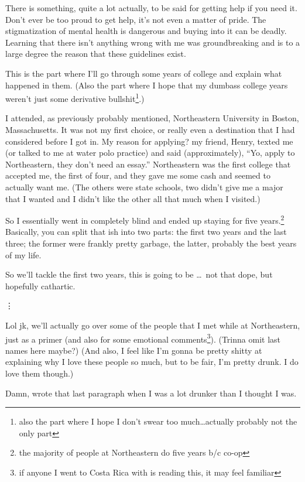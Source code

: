\documentclass[./butidigress.tex]{subfiles}
\begin{document}
There is something, quite a lot actually, to be said for getting help if you need it.
Don't ever be too proud to get help, it's not even a matter of pride.
The stigmatization of mental health is dangerous and buying into it can be deadly.
Learning that there isn't anything wrong with me was groundbreaking and is to a large degree the reason that these guidelines exist.

\label{subsec:narrative}
This is the part where I'll go through some years of college and explain what happened in them.
(Also the part where I hope that my dumbass college years weren't just some derivative bullshit\footnote{also the part where I hope I don't swear too much\ldots actually probably not the only part}.)

I attended, as previously probably mentioned, Northeastern University in Boston, Massachusetts.
It was not my first choice, or really even a destination that I had considered before I got in.
My reason for applying? my friend, Henry, texted me (or talked to me at water polo practice) and said (approximately), ``Yo, apply to Northeastern, they don't need an essay.''
Northeastern was the first college that accepted me, the first of four, and they gave me some cash and seemed to actually want me.
(The others were state schools, two didn't give me a major that I wanted and I didn't like the other all that much when I visited.)

So I essentially went in completely blind and ended up staying for five years.\footnote{the majority of people at Northeastern do five years b/c co-op}
Basically, you can split that ish into two parts: the first two years and the last three; the former were frankly pretty garbage, the latter, probably the best years of my life.

So we'll tackle the first two years, this is going to be \ldots\ not that dope, but hopefully cathartic.

\vdots

Lol jk, we'll actually go over some of the people that I met while at Northeastern, just as a primer (and also for some emotional comments\footnote{if anyone I went to Costa Rica with is reading this, it may feel familiar}).
(Trinna omit last names here maybe?)
(And also, I feel like I'm gonna be pretty shitty at explaining why I love these people so much, but to be fair, I'm pretty drunk.
I do love them though.)

Damn, wrote that last paragraph when I was a lot drunker than I thought I was.
\end{document}

